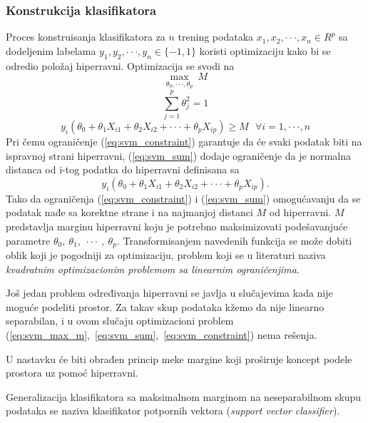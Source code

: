 \subsubsection{Konstrukcija klasifikatora}
Proces konstruisanja klasifikatora za $n$ trening podataka $x_1, x_2,\cdot\cdot\cdot,x_n \in R^p$
sa dodeljenim labelama $y_1, y_2, \cdot\cdot\cdot, y_n \in \{-1,1\}$ koristi
optimizaciju kako bi se odredio položaj hiperravni. Optimizacija se svodi na
\begin{equation} \label{eq:svm_max_m} \max\limits_{\theta_0, \cdot\cdot\cdot, \theta_p} \ M \end{equation}
\begin{equation} \label{eq:svm_sum} \sum_{j=1}^{p}\theta_{j}^2=1 \end{equation}
\begin{equation} \label{eq:svm_constraint} y_i\left(\theta_0 + \theta_1X_{i1} + \theta_2X_{i2} + \cdot\cdot\cdot + \theta_pX_{ip}\right) \geq M \ \ \ \forall i = 1, \cdot\cdot\cdot, n \end{equation}
Pri čemu ograničenje (\ref{eq:svm_constraint}) garantuje da će svaki podatak biti na ispravnoj strani hiperravni, (\ref{eq:svm_sum}) dodaje ograničenje da je normalna distanca od i-tog podatka
do hiperravni definisana sa $$y_i\left(\theta_0 + \theta_1X_{i1} + \theta_2X_{i2} + \cdot\cdot\cdot + \theta_pX_{ip}\right).$$ Tako da ograničenja (\ref{eq:svm_constraint}) i (\ref{eq:svm_sum}) omogućavanju
da se podatak nađe sa korektne strane i na najmanjoj distanci $M$ od hiperravni. $M$ predstavlja marginu hiperravni koju je potrebno maksimizovati
podešavanjuće parametre $\theta_0, \ \theta_1, \ \cdot\cdot\cdot \ , \ \theta_p$. Transformisanjem navedenih funkcija se može dobiti oblik koji je pogodniji za optimizaciju, problem koji se u literaturi naziva
\textit{kvadratnim optimizacionim problemom sa linearnim ograničenjima}.

Još jedan problem određivanja hiperravni se javlja u slučajevima kada nije moguće podeliti prostor.
Za takav skup podataka kžemo da nije linearno separabilan, i u ovom slučaju optimizacioni problem (\ref{eq:svm_max_m},\ \ref{eq:svm_sum},\ \ref{eq:svm_constraint}) nema rešenja.

U nastavku će biti obrađen princip meke margine koji proširuje koncept podele prostora uz pomoć hiperravni.

Generalizacija klasifikatora sa maksimalnom marginom na neseparabilnom skupu podataka se naziva klasifikator potpornih vektora (\textit{support vector classifier}).


